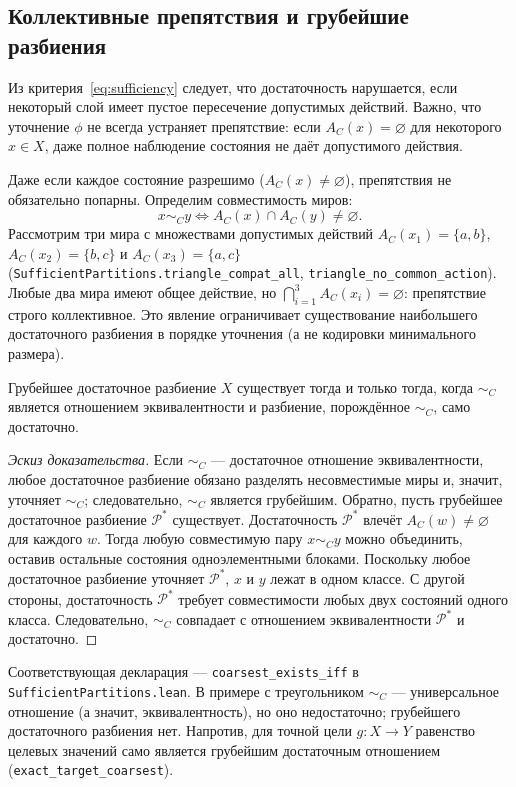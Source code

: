 \subsection{Коллективные препятствия и грубейшие разбиения}
Из критерия~\eqref{eq:sufficiency} следует, что достаточность нарушается, если некоторый слой имеет пустое пересечение допустимых действий. Важно, что уточнение $\phi$ не всегда устраняет препятствие: если $A_C(x) = \varnothing$ для некоторого $x \in X$, даже полное наблюдение состояния не даёт допустимого действия.

Даже если каждое состояние разрешимо ($A_C(x) \neq \varnothing$), препятствия не обязательно попарны. Определим совместимость миров:
\[
x \sim_C y \iff A_C(x) \cap A_C(y) \neq \varnothing.
\]
Рассмотрим три мира с множествами допустимых действий $A_C(x_1)=\{a,b\}$, $A_C(x_2)=\{b,c\}$ и $A_C(x_3)=\{a,c\}$ (\texttt{SufficientPartitions.triangle\_compat\_all}, \texttt{triangle\_no\_common\_action}). Любые два мира имеют общее действие, но $\bigcap_{i=1}^3 A_C(x_i) = \varnothing$: препятствие строго коллективное. Это явление ограничивает существование наибольшего достаточного разбиения в порядке уточнения (а не кодировки минимального размера).

\begin{theorem}
\label{thm:coarsest}
Грубейшее достаточное разбиение $X$ существует тогда и только тогда, когда $\sim_C$ является отношением эквивалентности и разбиение, порождённое $\sim_C$, само достаточно.
\end{theorem}
\begin{proof}[Эскиз доказательства]
Если $\sim_C$ --- достаточное отношение эквивалентности, любое достаточное разбиение обязано разделять несовместимые миры и, значит, уточняет $\sim_C$; следовательно, $\sim_C$ является грубейшим. Обратно, пусть грубейшее достаточное разбиение $\mathcal{P}^*$ существует. Достаточность $\mathcal{P}^*$ влечёт $A_C(w)\ne\varnothing$ для каждого $w$. Тогда любую совместимую пару $x\sim_C y$ можно объединить, оставив остальные состояния одноэлементными блоками. Поскольку любое достаточное разбиение уточняет $\mathcal{P}^*$, $x$ и $y$ лежат в одном классе. С другой стороны, достаточность $\mathcal{P}^*$ требует совместимости любых двух состояний одного класса. Следовательно, $\sim_C$ совпадает с отношением эквивалентности $\mathcal{P}^*$ и достаточно.
\end{proof}
Соответствующая декларация --- \texttt{coarsest\_exists\_iff} в \texttt{SufficientPartitions.lean}. В примере с треугольником $\sim_C$ --- универсальное отношение (а значит, эквивалентность), но оно недостаточно; грубейшего достаточного разбиения нет. Напротив, для точной цели $g:X\to Y$ равенство целевых значений само является грубейшим достаточным отношением (\texttt{exact\_target\_coarsest}).

